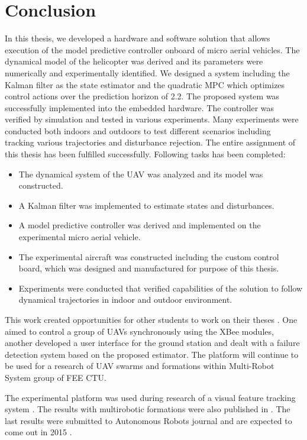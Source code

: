\section{Conclusion}

In this thesis, we developed a hardware and software solution that allows execution of the model predictive controller onboard of micro aerial vehicles. The dynamical model of the helicopter was derived and its parameters were numerically and experimentally identified. We designed a system including the Kalman filter as the state estimator and the quadratic MPC which optimizes control actions over the prediction horizon of 2.2. The proposed system was successfully implemented into the embedded hardware. The controller was verified by simulation and tested in various experiments. Many experiments were conducted both indoors and outdoors to test different scenarios including tracking various trajectories and disturbance rejection. The entire assignment of this thesis has been fulfilled successfully. Following tasks has been completed:

\begin{itemize}
\item The dynamical system of the UAV was analyzed and its model was constructed.
\item A Kalman filter was implemented to estimate states and disturbances.
\item A model predictive controller was derived and implemented on the experimental micro aerial vehicle.
\item The experimental aircraft was constructed including the custom control board, which was designed and manufactured for purpose of this thesis.
\item Experiments were conducted that verified capabilities of the solution to follow dynamical trajectories in indoor and outdoor environment.
\end{itemize}

This work created opportunities for other students to work on their theses \citep{klucka2015, fiedler2015}. One aimed to control a group of UAVs synchronously using the XBee modules, another developed a user interface for the ground station and dealt with a failure detection system based on the proposed estimator. The platform will continue to be used for a research of UAV swarms and formations within Multi-Robot System group of FEE CTU.

The experimental platform was used during research of a visual feature tracking system \citep{chudoba2014surf}. The results with multirobotic formations were also published in \citep{saska_baca2014}. The last results were submitted to Autonomous Robots journal and are expected to come out in 2015 \citep{saska2015submitted}. 

